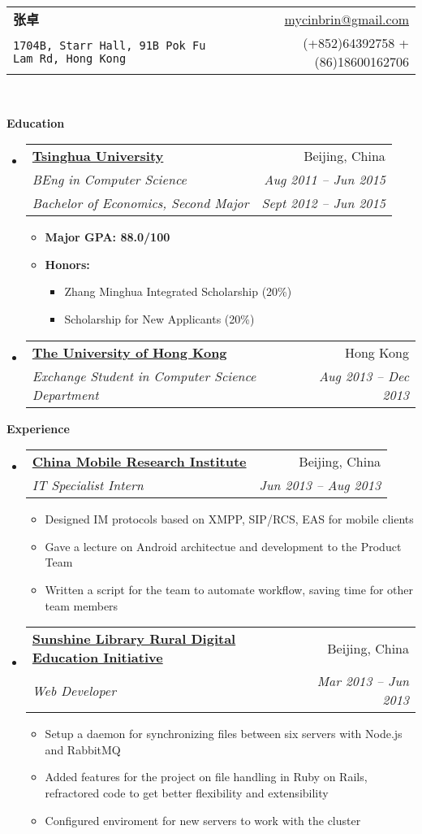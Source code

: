 \documentclass[letterpaper,11pt]{article}
\makeatletter
\newcommand{\resitem}[1]{\item #1 \vspace{-2pt}}
\newcommand{\resheading}[1]{{\large \colorbox{mygrey}{\begin{minipage}{\textwidth}{\textbf{#1 \vphantom{p\^{E}}}}\end{minipage}}}}
\newcommand{\ressubheading}[4]{
\begin{tabular*}{6.5in}{l@{\extracolsep{\fill}}r}
		\textbf{#1} & #2 \\
		\textit{#3} & \textit{#4} \\
\end{tabular*}\vspace{-6pt}}
\newcommand{\ressubheadingg}[6]{
\begin{tabular*}{6.5in}{l@{\extracolsep{\fill}}r}
		\textbf{#1} & #2 \\
		\textit{#3} & \textit{#4} \\
		\textit{#5} & \textit{#6} \\
\end{tabular*}\vspace{-6pt}}
\makeatother
\begin{document}
\newcommand{\mywebheader}{
\begin{tabular*}{7in}{l@{\extracolsep{\fill}}r}
	\textbf{{\LARGE 张卓}} & \href{mailto:mycinbrin@gmail.com}{mycinbrin@gmail.com}\\
	{\footnotesize \texttt{1704B, Starr Hall, 91B Pok Fu Lam Rd, Hong Kong}} & {(+852)64392758 +(86)18600162706}
	\end{tabular*}
\\
\vspace{0.1in}}

\mywebheader

\resheading{Education}
	\begin{itemize}
			\item
				\ressubheadingg{\href{http://www.tsinghua.edu.cn}{Tsinghua University}}{Beijing, China}{{BEng in Computer Science}}{Aug 2011 -- Jun 2015}{Bachelor of Economics, Second Major}{Sept 2012 -- Jun 2015}
				{ \footnotesize
				\begin{itemize}
						\resitem{\textbf{Major GPA: 88.0/100}}
						\resitem{\textbf{Honors:}} 
						\begin{itemize}
								\resitem{Zhang Minghua Integrated Scholarship (20\%) }
								\resitem{Scholarship for New Applicants (20\%) }
						\end{itemize}
				\end{itemize}
				}
			\item
				\ressubheading{\href{http://www.hku.hku}{The University of Hong Kong}}{Hong Kong}{Exchange Student in Computer Science Department}{Aug 2013 -- Dec 2013}{}
	\end{itemize} %

\resheading{Experience}
	\begin{itemize}
		\item 
			\ressubheading{\href{http://labs.chinamobile.com/}{China Mobile Research Institute}}{Beijing, China}
				{IT Specialist Intern}{Jun 2013 -- Aug 2013}
				{ \footnotesize
				\begin{itemize}

						\resitem{Designed IM protocols based on XMPP, SIP/RCS, EAS for mobile clients}
						\resitem{Gave a lecture on Android architectue and development to the Product Team}
						\resitem{Written a script for the team to automate workflow, saving time for other team members}
				\end{itemize}
				}
		\item 
			\ressubheading{\href{http://www.sunshine-library.org}{Sunshine Library Rural Digital Education Initiative}}{Beijing, China}{Web Developer}{Mar 2013 -- Jun 2013}
				{ \footnotesize
				\begin{itemize}
						\resitem{Setup a daemon for synchronizing files between six servers with Node.js and RabbitMQ}
						\resitem{Added features for the project on file handling in Ruby on Rails, refractored code to get better flexibility and extensibility}
						\resitem{Configured enviroment for new servers to work with the cluster}
				\end{itemize}
				}
	\end{itemize}  %
\end{document}
